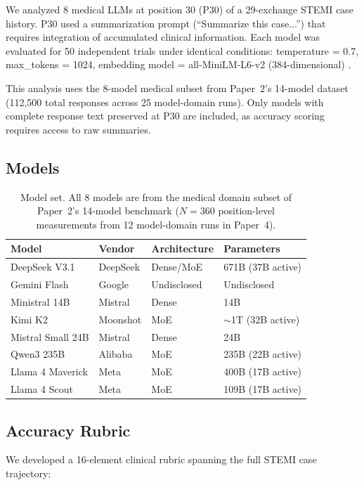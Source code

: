 \documentclass[11pt,a4paper]{article}
\begin{document}
We analyzed 8 medical LLMs at position 30 (P30) of a 29-exchange STEMI case history. P30 used a summarization prompt (``Summarize this case...'') that requires integration of accumulated clinical information. Each model was evaluated for 50 independent trials under identical conditions: temperature = 0.7, max\_tokens = 1024, embedding model = all-MiniLM-L6-v2 (384-dimensional) \citep{reimers2019sentence}.

This analysis uses the 8-model medical subset from Paper~2's 14-model dataset (112,500 total responses across 25 model-domain runs). Only models with complete response text preserved at P30 are included, as accuracy scoring requires access to raw summaries.

\subsection{Models}

\begin{table}[H]
\centering
\begin{tabular}{llll}
\toprule
\textbf{Model} & \textbf{Vendor} & \textbf{Architecture} & \textbf{Parameters} \\
\midrule
DeepSeek V3.1 & DeepSeek & Dense/MoE & 671B (37B active) \\
Gemini Flash & Google & Undisclosed & Undisclosed \\
Ministral 14B & Mistral & Dense & 14B \\
Kimi K2 & Moonshot & MoE & $\sim$1T (32B active) \\
Mistral Small 24B & Mistral & Dense & 24B \\
Qwen3 235B & Alibaba & MoE & 235B (22B active) \\
Llama 4 Maverick & Meta & MoE & 400B (17B active) \\
Llama 4 Scout & Meta & MoE & 109B (17B active) \\
\bottomrule
\end{tabular}
\caption{Model set. All 8 models are from the medical domain subset of Paper~2's 14-model benchmark ($N = 360$ position-level measurements from 12 model-domain runs in Paper~4).}
\label{tab:models}
\end{table}

\subsection{Accuracy Rubric}

We developed a 16-element clinical rubric spanning the full STEMI case trajectory:
\end{document}
